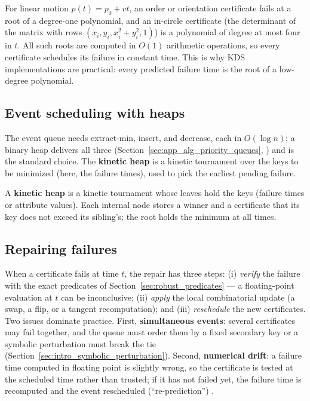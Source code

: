For linear motion $p(t) = p_0 + vt$, an order or orientation certificate
fails at a root of a degree-one polynomial, and an in-circle certificate
(the determinant of the matrix with rows $(x_i, y_i, x_i^2+y_i^2, 1)$) is a
polynomial of degree at most four in $t$. All such roots are computed in
$O(1)$ arithmetic operations, so every certificate schedules its failure in
constant time. This is why KDS implementations are practical: every
predicted failure time is the root of a low-degree polynomial.

\subsection*{Event scheduling with heaps}

The event queue needs extract-min, insert, and decrease, each in $O(\log
n)$; a binary heap delivers all three (Section~\ref{sec:app_alg_priority_queues},
\cite{cormen2009}) and is the standard choice. The \textbf{kinetic
heap} is a kinetic tournament over the keys to be
minimized (here, the failure times), used to pick the earliest pending
failure.

\begin{definition}\label{def:kinetic_heap}
  A \textbf{kinetic heap} is a kinetic tournament whose leaves hold the keys
  (failure times or attribute values). Each internal node stores a winner
  and a certificate that its key does not exceed its sibling's; the root
  holds the minimum at all times.
\end{definition}

\subsection*{Repairing failures}

When a certificate fails at time $t$, the repair has three steps: (i)
\emph{verify} the failure with the exact predicates of
Section~\ref{sec:robust_predicates} --- a floating-point evaluation at $t$
can be inconclusive; (ii) \emph{apply} the local combinatorial update (a
swap, a flip, or a tangent recomputation); and (iii) \emph{reschedule} the
new certificates. Two issues dominate practice. First,
\textbf{simultaneous events}: several certificates may fail together, and
the queue must order them by a fixed secondary key or a symbolic
perturbation must break the tie (Section~\ref{sec:intro_symbolic_perturbation}).
Second, \textbf{numerical drift}: a failure time computed in floating point
is slightly wrong, so the certificate is tested at the scheduled time rather
than trusted; if it has not failed yet, the failure time is recomputed and
the event rescheduled (``re-prediction'') \cite{guibas1998}.

